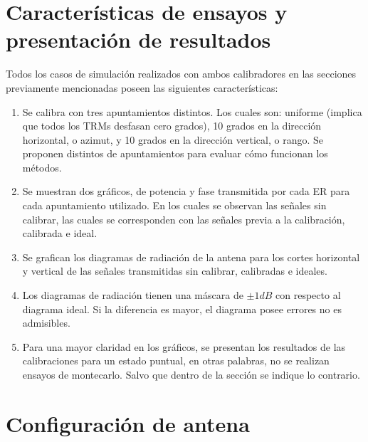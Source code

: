 \section{Características de ensayos y presentación de resultados}
\label{sc:characteristics}

Todos los casos de simulación realizados con ambos calibradores en las secciones previamente mencionadas poseen las siguientes
características:
\begin{enumerate}
	\item Se calibra con tres apuntamientos distintos. Los cuales son: uniforme (implica que todos los TRMs desfasan cero grados),
		10 grados en la dirección horizontal, o azimut, y 10 grados en la dirección vertical, o rango. Se proponen distintos de
		apuntamientos para evaluar cómo funcionan los métodos. 
	\item Se muestran dos gráficos, de potencia y fase transmitida por cada ER para cada apuntamiento utilizado. En los cuales se
		observan las señales sin calibrar, las cuales se corresponden con las señales previa a la calibración, calibrada e ideal. 
	\item Se grafican los diagramas de radiación de la antena para los cortes horizontal y vertical de las señales transmitidas
		sin calibrar, calibradas e ideales. 
	\item Los diagramas de radiación tienen una máscara de $\pm 1 dB$ con respecto al diagrama ideal. Si la diferencia es mayor,
		el diagrama posee errores no es admisibles. 
	\item Para una mayor claridad en los gráficos, se presentan los resultados de las calibraciones para un estado puntual, en
		otras palabras, no se realizan ensayos de montecarlo. Salvo que dentro de la sección se indique lo contrario.
\end{enumerate}


\section{Configuración de antena}

